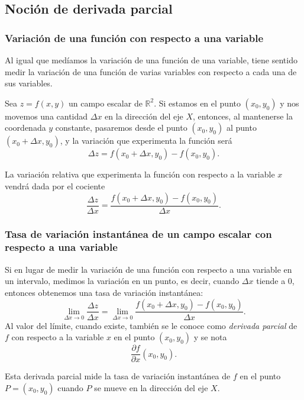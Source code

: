 \subsection{Noción de derivada parcial}
\begin{frame}
\frametitle{Variación de una función con respecto a una variable}
Al igual que medíamos la variación de una función de una variable, tiene sentido medir la variación de una función de
varias variables con respecto a cada una de sus variables.

Sea $z=f(x,y)$ un campo escalar de $\mathbb{R}^2$.
Si estamos en el punto $(x_0,y_0)$ y nos movemos una cantidad $\Delta x$ en la dirección del eje $X$, entonces, al
mantenerse la coordenada $y$ constante, pasaremos desde el punto $(x_0,y_0)$ al punto $(x_0+\Delta x,y_0)$, y la
variación que experimenta la función será
\[
\Delta z=f(x_0+\Delta x,y_0)-f (x_0,y_0).
\]

La variación relativa que experimenta la función con respecto a la variable $x$ vendrá dada por el cociente 
\[\frac{\Delta z}{\Delta x}=\frac{f(x_0+\Delta x,y_0)-f(x_0,y_0)}{\Delta x}.\]
\end{frame}


\begin{frame}
\frametitle{Tasa de variación instantánea de un campo escalar con respecto a una variable}
Si en lugar de medir la variación de una función con respecto a una variable en un intervalo, medimos la variación en un
punto, es decir, cuando $\Delta x$ tiende a 0, entonces obtenemos una tasa de variación instantánea:
\[
\lim_{\Delta x\rightarrow 0}\frac{\Delta z}{\Delta x}=\lim_{\Delta x \rightarrow 0}\frac{f(x_0+\Delta x,y_0)-f(x_0,y_0)}{\Delta x}.
\]
Al valor del límite, cuando existe, también se le conoce como \emph{derivada parcial} de $f$ con respecto a la variable $x$ en el punto $(x_0,y_0)$ y se nota
\[
\frac{\partial f}{\partial x}(x_0,y_0).
\]

Esta derivada parcial mide la tasa de variación instantánea de $f$ en el punto $P=(x_0,y_0)$ cuando $P$ se mueve en la dirección del eje $X$.
\end{frame}


